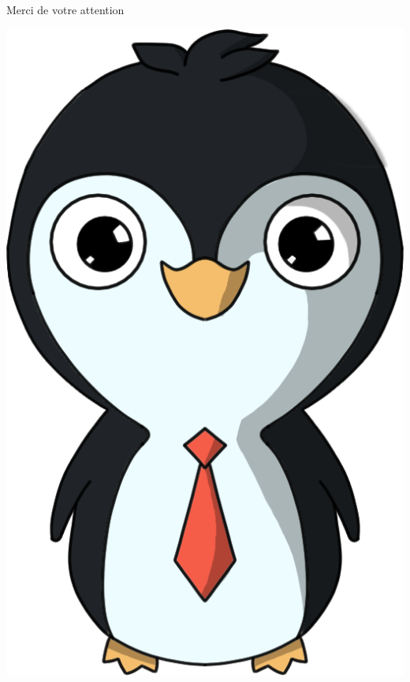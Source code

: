 \documentclass{beamer}
\begin{document}
\begin{frame}
\begin{center}
\Huge Merci de votre attention
\end{center}
\begin{center}
 \includegraphics[scale=0.55]{pingouin}
\end{center}
\end{frame}
\end{document}
